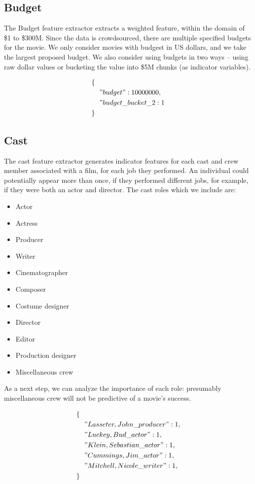 \documentclass[journal]{IEEEtran}
\begin{document}
\subsection{Budget}
The Budget feature extractor extracts a weighted feature, within the domain of
\$1 to \$300M.  Since the data is crowdsourced, there are multiple specified
budgets for the movie.  We only consider movies with budgest in US dollars, and
we take the largest proposed budget.  We also consider using budgets in two
ways -- using raw dollar values or bucketing the value into \$5M chunks (as
indicator variables).

\begin{align*}
        \{ \ \ & \\
        &"budget": 10000000,\\
        &"budget\_bucket\_2: 1\\
        \} \ \ &
\end{align*}

\subsection{Cast}
The cast feature extractor generates indicator features for each
cast and crew member associated with a film, for each job they 
performed.  An individual could potentially appear more than once,
if they performed different jobs, for example, if they were both
an actor and director.  The cast roles which we include are:
\begin{itemize}
	\item Actor
	\item Actress
	\item Producer
	\item Writer
	\item Cinematographer
	\item Composer
	\item Costume designer
	\item Director
	\item Editor
	\item Production designer
	\item Miscellaneous crew
\end{itemize}
As a next step, we can analyze the importance of each
role: presumably miscellaneous crew will not be predictive of a movie's
success.

\begin{align*}
        \{ \ \ & \\
        &"Lasseter,John\_producer": 1,\\
        &"Luckey,Bud\_actor": 1,\\
        &"Klein,Sebastian\_actor": 1,\\
        &"Cummings,Jim\_actor": 1,\\
        &"Mitchell,Nicole\_writer": 1,\\
        \} \ \ &
\end{align*}
\end{document}
